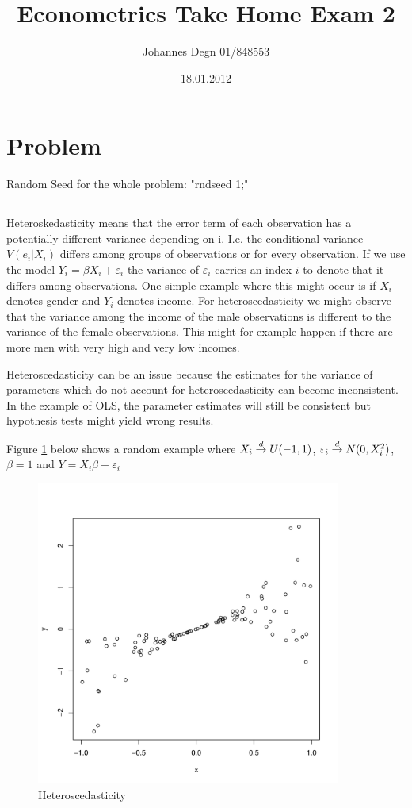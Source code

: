 \documentclass[11pt]{article}
\title{\textbf{Econometrics Take Home Exam 2}}
\author{Johannes Degn 01/848553}
\date{18.01.2012}
\theoremstyle{break}
\begin{document}
\maketitle


\section{Problem}
Random Seed for the whole problem: "rndseed 1;"

\subsection{}
Heteroskedasticity means that the error term of each observation has a potentially different variance depending on i. I.e. the conditional variance $V(e_i|X_i)$ differs among groups of observations or for every observation. If we use the model $Y_i = \beta X_i + \varepsilon_i$ the variance of $\varepsilon_i$ carries an index $i$ to denote that it differs among observations. One simple example where this might occur is if $X_i$ denotes gender and $Y_i$ denotes income. For heteroscedasticity we might observe that the variance among the income of the male observations is different to the variance of the female observations. This might for example happen if there are more men with very high and very low incomes.

Heteroscedasticity can be an issue because the estimates for the variance of parameters which do not account for heteroscedasticity can become inconsistent. In the example of OLS, the parameter estimates will still be consistent but hypothesis tests might yield wrong results.

Figure \ref{heteroscedasticity} below shows a random example where $X_i \;{\buildrel d \over \rightarrow}\; U(-1, 1)$, $\varepsilon_i \;{\buildrel d \over \rightarrow}\; N(0, X_i^2)$, $\beta = 1$ and $Y = X_i\beta+\varepsilon_i$

\begin{figure}[H]
\centering
\includegraphics[height=100mm]{heteroscedasticity.pdf}
\caption{Heteroscedasticity}
\label{heteroscedasticity}
\end{figure}
\end{document}
